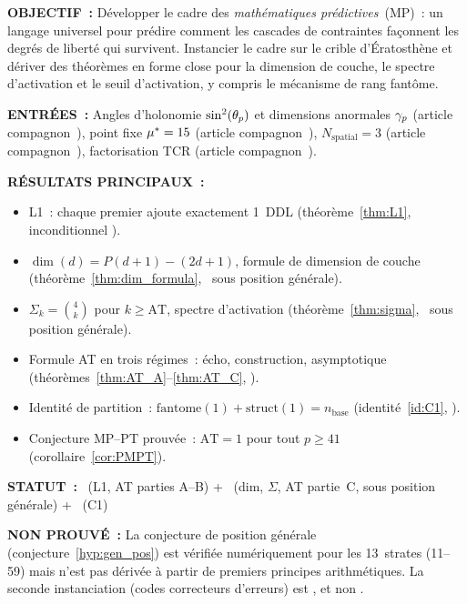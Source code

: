 \documentclass[12pt,a4paper]{article}
\begin{document}
\begin{statusbox}
\textbf{OBJECTIF~:}
  Développer le cadre des \emph{mathématiques prédictives}~(MP)~: un
  langage universel pour prédire comment les cascades de contraintes
  façonnent les degrés de liberté qui survivent. Instancier le cadre
  sur le crible d'Ératosthène et dériver des théorèmes en forme close
  pour la dimension de couche, le spectre d'activation et le seuil
  d'activation, y compris le mécanisme de rang fantôme.

\textbf{ENTRÉES~:}
  Angles d'holonomie $\sin^2(\theta_{p})$ et dimensions anormales $\gamma_{p}$
  (article compagnon~\cite{companion_M2}), point fixe ${\mu^{*}} = 15$
  (article compagnon~\cite{companion_M3}), $N_{\mathrm{spatial}} = 3$
  (article compagnon~\cite{companion_M3}), factorisation TCR (article
  compagnon~\cite{companion_M1}).

\textbf{RÉSULTATS PRINCIPAUX~:}
  \begin{itemize}[nosep]
  \item L1~: chaque premier ajoute exactement 1~DDL
    (théorème~\ref{thm:L1}, inconditionnel \THMTAG).
  \item $\dim(d) = P(d{+}1) - (2d{+}1)$, formule de dimension de
    couche (théorème~\ref{thm:dim_formula}, \THMTAG\ sous position
    générale).
  \item $\Sigma_k = \binom{4}{k}$ pour $k \ge \mathrm{AT}$, spectre
    d'activation (théorème~\ref{thm:sigma}, \THMTAG\ sous position
    générale).
  \item Formule AT en trois régimes~: écho, construction,
    asymptotique (théorèmes~\ref{thm:AT_A}--\ref{thm:AT_C},
    \THMTAG).
  \item Identité de partition~:
    $\mathrm{fantome}(1) + \mathrm{struct}(1) = n_{\mathrm{base}}$
    (identité~\ref{id:C1}, \IDTAG).
  \item Conjecture MP--PT prouvée~: $\mathrm{AT} = 1$ pour tout
    $p \ge 41$ (corollaire~\ref{cor:PMPT}).
  \end{itemize}

\textbf{STATUT~:}
  \THMTAG~(L1, AT parties A--B) + \THMTAG~(dim, $\Sigma$, AT
  partie~C, sous position générale) + \IDTAG~(C1)

\textbf{NON PROUVÉ~:}
  La conjecture de position générale
  (conjecture~\ref{hyp:gen_pos}) est vérifiée numériquement pour les
  13~strates (11--59) mais n'est pas dérivée à partir de premiers
  principes arithmétiques. La seconde instanciation (codes
  correcteurs d'erreurs) est \VALTAG, et non \THMTAG.
\end{statusbox}
\end{document}
